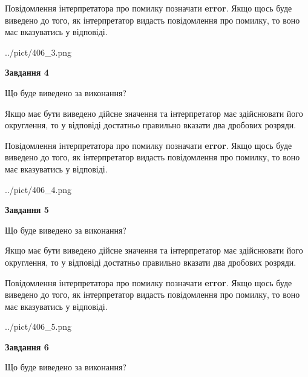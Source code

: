 \documentclass[12pt, ukrainian]{article}
\begin{document}
{\begin {Large}
Повідомлення інтерпретатора про помилку позначати \textbf{error}.
Якщо щось буде виведено до того, як інтерпретатор видасть повідомлення про помилку, 
то воно має вказуватись у відповіді. \par

\begin{center}
	{../pict/406_3.png}
\end{center}
\newpage

{\begin {center}\textbf{Завдання 4}\end {center}}\par
Що буде виведено за виконання? \par

Якщо має бути виведено дійсне значення та інтерпретатор має здійснювати його округлення, 
то у відповіді достатньо правильно вказати два дробових розряди.

Повідомлення інтерпретатора про помилку позначати \textbf{error}.
Якщо щось буде виведено до того, як інтерпретатор видасть повідомлення про помилку, 
то воно має вказуватись у відповіді. \par

\begin{center}
	{../pict/406_4.png}
\end{center}
\newpage

{\begin {center}\textbf{Завдання 5}\end {center}}\par
Що буде виведено за виконання? \par

Якщо має бути виведено дійсне значення та інтерпретатор має здійснювати його округлення, 
то у відповіді достатньо правильно вказати два дробових розряди.

Повідомлення інтерпретатора про помилку позначати \textbf{error}.
Якщо щось буде виведено до того, як інтерпретатор видасть повідомлення про помилку, 
то воно має вказуватись у відповіді. \par

\begin{center}
	{../pict/406_5.png}
\end{center}
\newpage

{\begin {center}\textbf{Завдання 6}\end {center}}\par
Що буде виведено за виконання? \par


\end{Large}}
\end{document}
